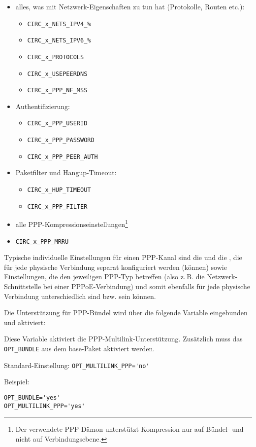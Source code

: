 \begin{itemize}
\item alles, was mit Netzwerk-Eigenschaften zu tun hat (Protokolle, Routen
etc.):
\begin{itemize}
\item \verb+CIRC_x_NETS_IPV4_%+
\item \verb+CIRC_x_NETS_IPV6_%+
\item \verb+CIRC_x_PROTOCOLS+
\item \verb+CIRC_x_USEPEERDNS+
\item \verb+CIRC_x_PPP_NF_MSS+
\end{itemize}
\item Authentifizierung:
\begin{itemize}
\item \verb+CIRC_x_PPP_USERID+
\item \verb+CIRC_x_PPP_PASSWORD+
\item \verb+CIRC_x_PPP_PEER_AUTH+
\end{itemize}
\item Paketfilter und Hangup-Timeout:
\begin{itemize}
\item \verb+CIRC_x_HUP_TIMEOUT+
\item \verb+CIRC_x_PPP_FILTER+
\end{itemize}
\item alle PPP-Kompressionseinstellungen\footnote{Der verwendete PPP-Dämon
unterstützt Kompression nur auf Bündel- und nicht auf Verbindungsebene.}
\item \verb+CIRC_x_PPP_MRRU+
\end{itemize}

Typische individuelle Einstellungen für einen PPP-Kanal sind die
 und die , die für jede physische
Verbindung separat konfiguriert werden (können) sowie Einstellungen, die den
jeweiligen PPP-Typ betreffen (also z.\,B. die Netzwerk-Schnittstelle bei
einer PPPoE-Verbindung) und somit ebenfalls für jede physische Verbindung
unterschiedlich sind bzw. sein können.

Die Unterstützung für PPP-Bündel wird über die folgende Variable eingebunden
und aktiviert:

\begin{description}

Diese Variable aktiviert die PPP-Multilink-Unterstützung. Zusätzlich muss das
\verb+OPT_BUNDLE+ aus dem base-Paket aktiviert werden.

Standard-Einstellung: \verb+OPT_MULTILINK_PPP='no'+

Beispiel:
\begin{example}
\begin{verbatim}
OPT_BUNDLE='yes'
OPT_MULTILINK_PPP='yes'
\end{verbatim}
\end{example}

\end{description}

